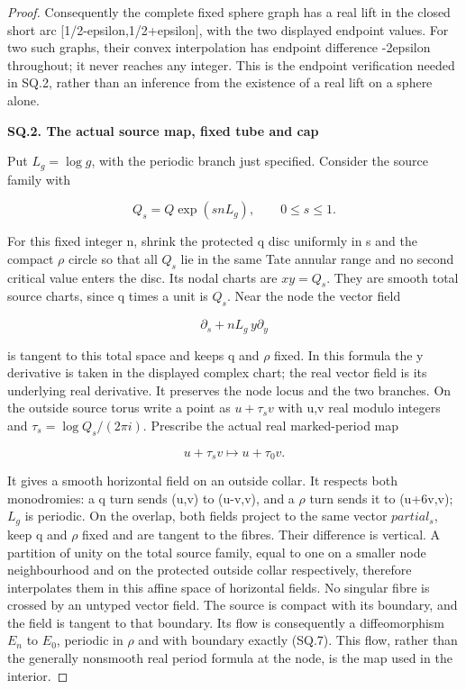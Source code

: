 \begin{proof}
Consequently the complete fixed sphere graph has a real lift in the closed short arc
{[}1/2-epsilon,1/2+epsilon{]}, with the two displayed endpoint values.
For two such graphs, their convex interpolation has endpoint
difference -2epsilon throughout; it never reaches any integer.
This is the endpoint verification needed in SQ.2, rather than an
inference from the existence of a real lift on a sphere alone.

\par

\medskip\noindent\textbf{SQ.2. The actual source map, fixed tube and cap}

\par\nobreak

Put \(L_g=\log g\), with the periodic branch just specified. Consider the
source family with

\[
                      Q_s=Q\exp(snL_g),\qquad0\le s\le1.
                                                        \tag{SQ.5}
\]

For this fixed integer n, shrink the protected q disc uniformly in s
and the compact \(\rho\) circle so that all \(Q_{s}\) lie in the same Tate
annular range and no second critical value enters the disc.
Its nodal charts are \(xy=Q_s\). They are smooth total source charts,
since q times a unit is \(Q_{s}\). Near the node the vector field

\[
                 \partial_s+nL_g\,y\partial_y           \tag{SQ.6}
\]

is tangent to this total space and keeps q and \(\rho\) fixed. In this
formula the y derivative is taken in the displayed complex chart;
the real vector field is its underlying real derivative. It preserves
the node locus and the two branches. On the outside source torus
write a point as \(u+\tau_s v\) with u,v real modulo integers and
\(\tau_s=\log Q_s/(2\pi i)\). Prescribe the actual real marked-period map

\[
              u+\tau_s v\longmapsto u+\tau_0v.           \tag{SQ.7}
\]

It gives a smooth horizontal field on an outside collar. It respects
both monodromies: a q turn sends (u,v) to (u-v,v), and a \(\rho\) turn
sends it to (u+6v,v); \(L_{g}\) is periodic. On the overlap, both fields
project to the same vector \(partial_{s}\), keep q and \(\rho\) fixed and are
tangent to the fibres. Their difference is vertical. A partition of
unity on the total source family, equal to one on a smaller node
neighbourhood and on the protected outside collar respectively,
therefore interpolates them in this affine space of horizontal
fields. No singular fibre is crossed by an untyped vector field.
The source is compact with its boundary, and the field is tangent to
that boundary. Its flow is consequently a diffeomorphism \(E_{n}\) to \(E_{0}\),
periodic in \(\rho\) and with boundary exactly (SQ.7). This flow, rather
than the generally nonsmooth real period formula at the node, is the
map used in the interior.


\end{proof}
